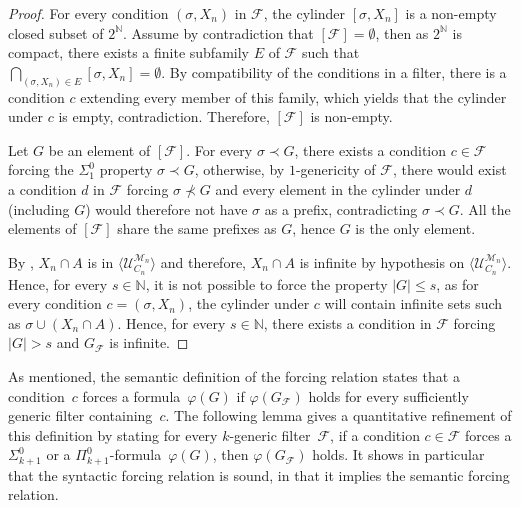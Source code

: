 \documentclass{article}
\def\NN{\mathbb{N}}
\def\F{\mathcal{F}}
\def\U{\mathcal{U}}
\def\M{\mathcal{M}}
\numberwithin{theorem}{section}
\newtheorem{proposition}[theorem]{Proposition}
\theoremstyle{definition}
\begin{document}
\begin{proof}
For every condition $(\sigma,X_n)$ in $\F$, the cylinder $[\sigma, X_n]$ is a non-empty closed subset of $2^{\NN}$. Assume by contradiction that $[\F] = \emptyset$, then as $2^{\NN}$ is compact, there exists a finite subfamily $E$ of $\F$ such that $\bigcap_{(\sigma, X_n) \in E} [\sigma, X_n] = \emptyset$. By compatibility of the conditions in a filter, there is a condition $c$ extending every member of this family, which yields that the cylinder under $c$ is empty, contradiction. Therefore, $[\F]$ is non-empty. 

Let $G$ be an element of $[\F]$. For every $\sigma \prec G$, there exists a condition $c \in \F$ forcing the $\Sigma_1^0$ property $\sigma \prec G$, otherwise, by $1$-genericity of $\F$, there would exist a condition $d$ in $\F$ forcing $\sigma \not \prec G$ and every element in the cylinder under $d$ (including $G$) would therefore not have $\sigma$ as a prefix, contradicting $\sigma \prec G$. All the elements of $[\F]$ share the same prefixes as $G$, hence $G$ is the only element.

By , $X_n \cap A$ is in $\langle \U_{C_n}^{\M_n} \rangle$ and therefore, $X_n \cap A$ is infinite by hypothesis on $\langle \U_{C_n}^{\M_n} \rangle$. Hence, for every $s \in \NN$, it is not possible to force the property $|G| \leq s$, as for every condition $c = (\sigma,X_n)$, the cylinder under $c$ will contain infinite sets such as $\sigma \cup (X_n \cap A)$. Hence, for every $s \in \NN$, there exists a condition in $\F$ forcing $|G| > s$ and $G_{\F}$ is infinite.
\end{proof}

As mentioned, the semantic definition of the forcing relation states that a condition~$c$ forces a formula~$\varphi(G)$ if $\varphi(G_\F)$ holds for every sufficiently generic filter containing~$c$. The following lemma gives a quantitative refinement of this definition by stating for every $k$-generic filter~$\F$, if a condition $c \in \F$ forces a $\Sigma^0_{k+1}$ or a $\Pi^0_{k+1}$-formula~$\varphi(G)$, then $\varphi(G_\F)$ holds. It shows in particular that the syntactic forcing relation is sound, in that it implies the semantic forcing relation.
\end{document}
